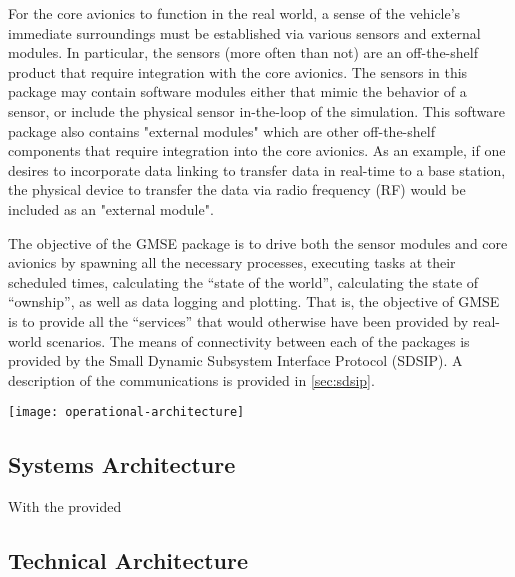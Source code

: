 For the core avionics to function in the real world, a sense of the vehicle's immediate surroundings
must be established via various sensors and external modules. In particular, the sensors (more often
than not) are an off-the-shelf product that require integration with the core avionics. The sensors
in this package may contain software modules either that mimic the behavior of a sensor, or include
the physical sensor in-the-loop of the simulation. This software package also contains "external
modules" which are other off-the-shelf components that require integration into the core avionics.
As an example, if one desires to incorporate data linking to transfer data in real-time to a base
station, the physical device to transfer the data via radio frequency (RF) would be included as an
"external module".

The objective of the GMSE package is to drive both the sensor modules and core avionics by spawning
all the necessary processes, executing tasks at their scheduled times, calculating the ``state of
the world'', calculating the state of ``ownship'', as well as data logging and plotting. That is,
the objective of GMSE is to provide all the ``services'' that would otherwise have been provided by
real-world scenarios. The means of connectivity between each of the packages is provided by the
Small Dynamic Subsystem Interface Protocol (SDSIP). A description of the communications is provided
in \autoref{sec:sdsip}.

\begin{figure*}[ht]
\texttt{[image: operational-architecture]}
\caption{}
\label{fig:operational-architecture}
\end{figure*}

\subsection{Systems Architecture}
\label{sec:systems-architecture}

With the provided

\subsection{Technical Architecture}
\label{sec:technical-architecture}

